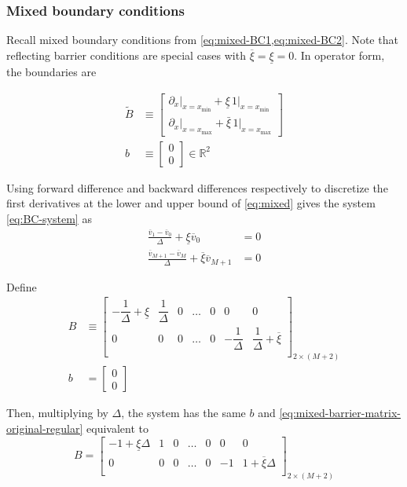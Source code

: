 \documentclass[11pt]{article}
\newcommand{\R}{\ensuremath{\mathbb{R}}}
\theoremstyle{definition}
\begin{document}
\subsubsection{Mixed boundary conditions}
Recall mixed boundary conditions from \cref{eq:mixed-BC1,eq:mixed-BC2}. Note that reflecting barrier conditions are special cases with $\overline{\xi} = \underline{\xi} = 0$.  In operator form, the boundaries are

\begin{align}
\tilde{B} &\equiv \begin{bmatrix}
\partial_x\vert_{x = x_{\min}} + \underline{\xi}\,1 \vert_{x = x_{\min}}\\
\partial_x\vert_{x = x_{\max}} + \bar{\xi}\,1 \vert_{x = x_{\max}}
\end{bmatrix}\label{eq:mixed}\\
b &\equiv \begin{bmatrix} 0\\ 0 \end{bmatrix}\in \R^2
\end{align}

Using forward difference and backward differences respectively to discretize the first derivatives at the lower and upper bound of \cref{eq:mixed} gives the system \cref{eq:BC-system} as
\begin{align}
\frac{\overline{v}_1 - \overline{v}_0}{\Delta} + \underline{\xi} \overline{v}_0 &= 0\label{eq:regular-mixed-1} \\
\frac{\overline{v}_{M+1} - \overline{v}_M}{\Delta} + \overline{\xi} \overline{v}_{M+1} &= 0\label{eq:regular-mixed-2}
\end{align}

Define
\begin{align}
B &\equiv \begin{bmatrix}
-\dfrac{1}{\Delta} + \underline{\xi} & \dfrac{1}{\Delta} & 0 & \dots & 0 & 0 & 0 \\
0 & 0 & 0 & \dots & 0 & -\dfrac{1}{\Delta} & \dfrac{1}{\Delta} + \overline{\xi}\\
\end{bmatrix}_{2 \times (M+2)}\label{eq:mixed-barrier-matrix-original-regular}\\
b &= \begin{bmatrix}
0 \\
0
\end{bmatrix}
\end{align}

Then, multiplying by $\Delta$, the system has the same $b$ and \cref{eq:mixed-barrier-matrix-original-regular}  equivalent to
\begin{equation}
B = \begin{bmatrix}
-1 +  \underline{\xi} \Delta & 1 & 0 & \dots & 0 & 0 & 0 \\
0 & 0 & 0 & \dots & 0 & -1 & 1 + \overline{\xi} \Delta\\
\end{bmatrix}_{2 \times (M+2)}\label{eq:B-mixed}
\end{equation}
\end{document}
